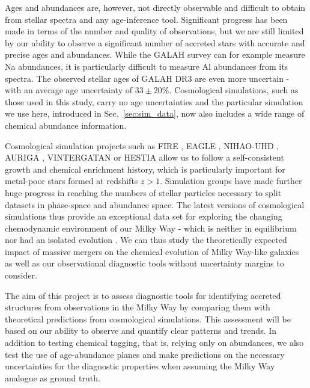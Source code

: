 \documentclass[fleqn,usenatbib]{mnras}
\begin{document}
Ages and abundances are, however, not directly observable and difficult to obtain from stellar spectra and any age-inference tool. Significant progress has been made in terms of the number and quality of observations, but we are still limited by our ability to observe a significant number of accreted stars with accurate and precise ages and abundances. While the GALAH survey can for example measure Na abundances, it is particularly difficult to measure Al abundances from its spectra. The observed stellar ages of GALAH DR3 are even more uncertain - with an average age uncertainty of $33\pm20\%$. Cosmological simulations, such as those used in this study, carry no age uncertainties and the particular simulation \citep{Buck2021} we use here, introduced in Sec.~\ref{sec:sim_data}, now also includes a wide range of chemical abundance information. 

Cosmological simulation projects such as \textsc{FIRE} \citep{Bonaca2017, Horta2023}, \textsc{EAGLE} \citep{Mackereth2019}, \textsc{NIHAO-UHD} \citep{Buck2020,Buck2021,Buck2023}, \textsc{AURIGA} \citep[][]{Grand2020}, \textsc{VINTERGATAN} \citep{Agertz2021} or  \textsc{HESTIA} \citep{Khoperskov2023} allow us to follow a self-consistent growth and chemical enrichment history, which is particularly important for metal-poor stars formed at redshifts $z>1$. Simulation groups have made further huge progress in reaching the numbers of stellar particles necessary to split datasets in phase-space and abundance space. The latest versions of cosmological simulations thus provide an exceptional data set for exploring the changing chemodynamic environment of our Milky Way - which is neither in equilibrium \citep[see e.g.][]{Antoja2018, BlandHawthorn2019} nor had an isolated evolution \citep{Helmi2020}. We can thus study the theoretically expected impact of massive mergers on the chemical evolution of Milky Way-like galaxies \citep{Buck2021,Buck2023} as well as our observational diagnostic tools without uncertainty margins to consider.

The aim of this project is to assess diagnostic tools for identifying accreted structures from observations in the Milky Way by comparing them with theoretical predictions from cosmological simulations. This assessment will be based on our ability to observe and quantify clear patterns and trends. In addition to testing chemical tagging, that is, relying only on abundances, we also test the use of age-abundance planes and make predictions on the necessary uncertainties for the diagnostic properties when assuming the Milky Way analogue as ground truth.
\end{document}
